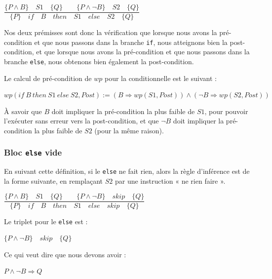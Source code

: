 \documentclass[12pt,francais,]{scrbook}
\begin{document}
\begin{center}
\(\dfrac{\{P \wedge B\}\quad S1\quad \{Q\} \quad \quad \{P \wedge \neg B\}\quad S2\quad \{Q\}}{\{P\}\quad if\quad B\quad then\quad S1\quad else\quad S2 \quad \{Q\}}\)
\end{center}

Nos deux prémisses sont donc la vérification que lorsque nous avons la
pré-condition et que nous passons dans la branche \texttt{if}, nous
atteignons bien la post-condition, et que lorsque nous avons la
pré-condition et que nous passons dans la branche \texttt{else}, nous
obtenons bien également la post-condition.

Le calcul de pré-condition de \(wp\) pour la conditionnelle est le
suivant :

\begin{center}
\(wp(if\ B\ then\ S1\ else\ S2 , Post) := (B \Rightarrow wp(S1, Post)) \wedge (\neg B \Rightarrow wp(S2, Post))\)
\end{center}

À savoir que \(B\) doit impliquer la pré-condition la plus faible de
\(S1\), pour pouvoir l'exécuter sans erreur vers la post-condition, et
que \(\neg B\) doit impliquer la pré-condition la plus faible de \(S2\)
(pour la même raison).

\subsubsection{\texorpdfstring{Bloc \texttt{else}
vide}{Bloc else vide}}\label{bloc-else-vide}

En suivant cette définition, si le \texttt{else} ne fait rien, alors la
règle d'inférence est de la forme suivante, en remplaçant \(S2\) par une
instruction « ne rien faire ».

\begin{center}
\(\dfrac{\{P \wedge B\}\quad S1\quad \{Q\} \quad \quad \{P \wedge \neg B\}\quad skip\quad \{Q\}}{\{P\}\quad if\quad B\quad then\quad S1\quad else\quad skip \quad \{Q\}}\)
\end{center}

Le triplet pour le \texttt{else} est :

\begin{center} \(\{P \wedge \neg B\}\quad skip\quad \{Q\}\)
\end{center}

Ce qui veut dire que nous devons avoir :

\begin{center} \(P \wedge \neg B \Rightarrow Q\) \end{center}
\end{document}
